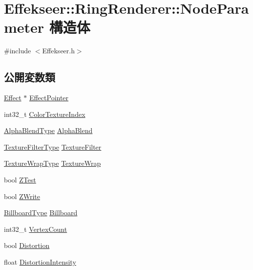 \hypertarget{struct_effekseer_1_1_ring_renderer_1_1_node_parameter}{}\section{Effekseer\+:\+:Ring\+Renderer\+:\+:Node\+Parameter 構造体}
\label{struct_effekseer_1_1_ring_renderer_1_1_node_parameter}


{\ttfamily \#include $<$Effekseer.\+h$>$}

\subsection*{公開変数類}
\begin{DoxyCompactItemize}
\item 
\mbox{\hyperlink{class_effekseer_1_1_effect}{Effect}} $\ast$ \mbox{\hyperlink{struct_effekseer_1_1_ring_renderer_1_1_node_parameter_ae1c9f002e049c0e9abeb566da9964ac5}{Effect\+Pointer}}
\item 
int32\+\_\+t \mbox{\hyperlink{struct_effekseer_1_1_ring_renderer_1_1_node_parameter_a79072a2a942423e1eb5c56dc5f6a1569}{Color\+Texture\+Index}}
\item 
\mbox{\hyperlink{namespace_effekseer_a8c32fd5b7ec7feed73314b2ae8086949}{Alpha\+Blend\+Type}} \mbox{\hyperlink{struct_effekseer_1_1_ring_renderer_1_1_node_parameter_a73f862f36c32e13c7e3109be755acad3}{Alpha\+Blend}}
\item 
\mbox{\hyperlink{namespace_effekseer_ae3518502cfcb4ec4991f13c0b3e4c6ee}{Texture\+Filter\+Type}} \mbox{\hyperlink{struct_effekseer_1_1_ring_renderer_1_1_node_parameter_aa1022172d7ccef9bc3ea615bd7d4f510}{Texture\+Filter}}
\item 
\mbox{\hyperlink{namespace_effekseer_a5320c83784602974b6278bf1a77b58a3}{Texture\+Wrap\+Type}} \mbox{\hyperlink{struct_effekseer_1_1_ring_renderer_1_1_node_parameter_a9c62da9c931b5c19c528f46cc5e1626d}{Texture\+Wrap}}
\item 
bool \mbox{\hyperlink{struct_effekseer_1_1_ring_renderer_1_1_node_parameter_a961db93480860064f1f432a6166e583e}{Z\+Test}}
\item 
bool \mbox{\hyperlink{struct_effekseer_1_1_ring_renderer_1_1_node_parameter_a26d4576d9bb81f221230f178637f352b}{Z\+Write}}
\item 
\mbox{\hyperlink{namespace_effekseer_a1e51959dc188f6f19acc48c85860c6d8}{Billboard\+Type}} \mbox{\hyperlink{struct_effekseer_1_1_ring_renderer_1_1_node_parameter_a834a9662e348bf4b79779586628530a5}{Billboard}}
\item 
int32\+\_\+t \mbox{\hyperlink{struct_effekseer_1_1_ring_renderer_1_1_node_parameter_a25fe9b429b69811b492894d938df31a7}{Vertex\+Count}}
\item 
bool \mbox{\hyperlink{struct_effekseer_1_1_ring_renderer_1_1_node_parameter_a0a2ba718e4b716c3959216d5e22758a3}{Distortion}}
\item 
float \mbox{\hyperlink{struct_effekseer_1_1_ring_renderer_1_1_node_parameter_a533b7d84f37defe0accbcfaeb2a4ed50}{Distortion\+Intensity}}
\end{DoxyCompactItemize}


